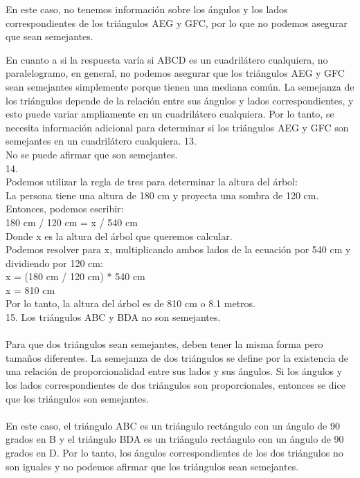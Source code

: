 \documentclass{article}
\begin{document}
En este caso, no tenemos información sobre los ángulos y los lados correspondientes de los triángulos AEG y GFC, por lo que no podemos asegurar que sean semejantes.

En cuanto a si la respuesta varía si ABCD es un cuadrilátero cualquiera, no paralelogramo, en general, no podemos asegurar que los triángulos AEG y GFC sean semejantes simplemente porque tienen una mediana común. La semejanza de los triángulos depende de la relación entre sus ángulos y lados correspondientes, y esto puede variar ampliamente en un cuadrilátero cualquiera. Por lo tanto, se necesita información adicional para determinar si los triángulos AEG y GFC son semejantes en un cuadrilátero cualquiera.
{\Large 13.}
\\
No se puede afirmar que son semejantes.
\\
{\Large 14.}
\\
Podemos utilizar la regla de tres para determinar la altura del árbol:\\
La persona tiene una altura de 180 cm y proyecta una sombra de 120 cm. Entonces, podemos escribir:\\
180 cm / 120 cm = x / 540 cm\\
Donde x es la altura del árbol que queremos calcular.\\
Podemos resolver para x, multiplicando ambos lados de la ecuación por 540 cm y dividiendo por 120 cm:\\
x = (180 cm / 120 cm) * 540 cm\\
x = 810 cm\\
Por lo tanto, la altura del árbol es de 810 cm o 8.1 metros.\\
{\Large 15.}
Los triángulos ABC y BDA no son semejantes. \\
\\
Para que dos triángulos sean semejantes, deben tener la misma forma pero tamaños diferentes. La semejanza de dos triángulos se define por la existencia de una relación de proporcionalidad entre sus lados y sus ángulos. Si los ángulos y los lados correspondientes de dos triángulos son proporcionales, entonces se dice que los triángulos son semejantes.\\
\\
En este caso, el triángulo ABC es un triángulo rectángulo con un ángulo de 90 grados en B y el triángulo BDA es un triángulo rectángulo con un ángulo de 90 grados en D. Por lo tanto, los ángulos correspondientes de los dos triángulos no son iguales y no podemos afirmar que los triángulos sean semejantes.\\
\end{document}
